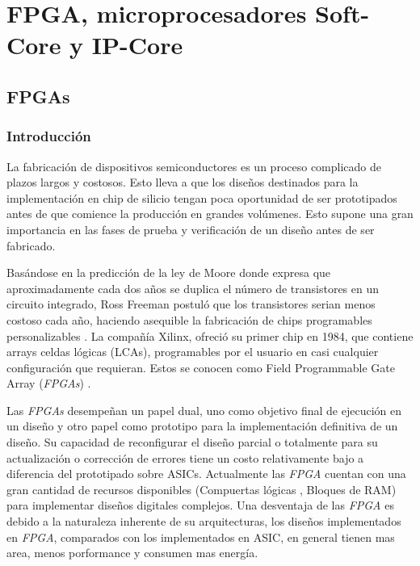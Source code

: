 \chapter{FPGA, microprocesadores Soft-Core y IP-Core}
\section{FPGAs}
	\subsection{Introducción}
	\par
	La fabricación de dispositivos semiconductores es un proceso complicado de plazos largos y costosos. Esto lleva a que los diseños destinados para la 
	implementación en chip de silicio tengan poca oportunidad de ser prototipados antes de que comience la producción en grandes volúmenes. Esto supone
	una gran importancia en las fases de prueba y verificación de un diseño antes de ser fabricado.
	\vspace{0.5cm}
	\par
	Basándose en la predicción de la ley de Moore donde expresa que aproximadamente cada dos años se duplica el número de transistores en un circuito
	integrado\cite{Etiqueta02}, Ross Freeman postuló que los transistores serian menos costoso cada año, haciendo asequible la fabricación de chips
	programables personalizables \cite{Etiqueta03}. La compañía Xilinx, ofreció su primer chip en 1984, que contiene arrays celdas lógicas (LCAs),
	programables por el usuario en casi cualquier configuración que requieran. Estos se conocen como Field Programmable Gate Array (\textit{FPGAs}) .
	\vspace{0.5cm}
	\par
	Las \textit{FPGAs} desempeñan un papel dual, uno como objetivo final de ejecución en un diseño y otro papel como prototipo para la implementación
	definitiva de un diseño. Su capacidad de reconfigurar el diseño parcial o totalmente para su actualización o corrección de errores tiene un costo
	relativamente bajo a diferencia del prototipado sobre ASICs. Actualmente las \textit{FPGA} cuentan con una gran cantidad de recursos disponibles
	(Compuertas lógicas , Bloques de RAM) para implementar diseños digitales complejos. Una desventaja de las \textit{FPGA} es debido a la naturaleza
	inherente de su arquitecturas, los diseños implementados en \textit{FPGA}, comparados con los implementados en ASIC, en general tienen mas area,
	menos porformance y consumen mas energía.
	\vspace{0.5cm}
